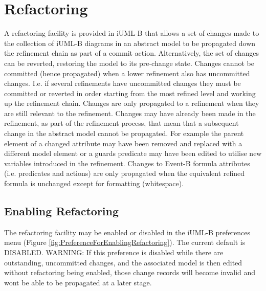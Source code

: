 \section{Refactoring}
\label{sec:component_diagrams-refactoring}

A refactoring facility is provided in iUML-B that allows a set of changes made to the collection of iUML-B diagrams in an abstract model to be propagated down the refinement chain as part of a commit action. Alternatively, the set of changes can be reverted, restoring the model to its pre-change state.
Changes cannot be committed (hence propagated) when a lower refinement also has uncommitted changes. I.e. if several refinements have uncommitted changes they must be committed or reverted in order starting from the most refined level and working up the refinement chain. 
Changes are only propagated to a refinement when they are still relevant to the refinement. Changes may have already been made in the refinement, as part of the refinement process, that mean that a subsequent change in the abstract model cannot be propagated. For example the parent element of a changed attribute may have been removed and replaced with a different model element or a guards predicate may have been edited to utilise new variables introduced in the refinement. Changes to Event-B formula attributes (i.e. predicates and actions) are only propagated when the equivalent refined formula is unchanged except for formatting (whitespace).

\subsection{Enabling Refactoring}

The refactoring facility may be enabled or disabled in the iUML-B preferences menu (Figure \ref{fig:PreferenceForEnablingRefactoring}). The current default is DISABLED.  
WARNING: If this preference is disabled while there are outstanding, uncommitted changes, and the associated model is then edited without refactoring being enabled, those change records will become invalid and wont be able to be propagated at a later stage.

